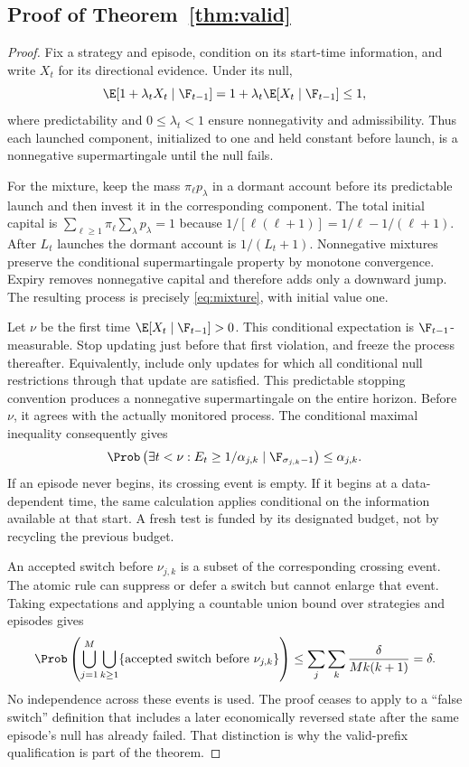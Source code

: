 \subsection{Proof of Theorem~\ref{thm:valid}}
\begin{proof}
Fix a strategy and episode, condition on its start-time information, and write $X_t$ for its directional evidence. Under its null,
\[
 \E[1+\lambda_tX_t\mid\F_{t-1}]
 =1+\lambda_t\E[X_t\mid\F_{t-1}]\le1,
\]
where predictability and $0\le\lambda_t<1$ ensure nonnegativity and admissibility. Thus each launched component, initialized to one and held constant before launch, is a nonnegative supermartingale until the null fails.

For the mixture, keep the mass $\pi_\ell p_\lambda$ in a dormant account before its predictable launch and then invest it in the corresponding component. The total initial capital is
$\sum_{\ell\ge1}\pi_\ell\sum_\lambda p_\lambda=1$ because
$1/[\ell(\ell+1)]=1/\ell-1/(\ell+1)$.
After $L_t$ launches the dormant account is $1/(L_t+1)$. Nonnegative mixtures preserve the conditional supermartingale property by monotone convergence. Expiry removes nonnegative capital and therefore adds only a downward jump. The resulting process is precisely \eqref{eq:mixture}, with initial value one.

Let $\nu$ be the first time $\E[X_t\mid\F_{t-1}]>0$. This conditional expectation is $\F_{t-1}$-measurable. Stop updating just before that first violation, and freeze the process thereafter. Equivalently, include only updates for which all conditional null restrictions through that update are satisfied. This predictable stopping convention produces a nonnegative supermartingale on the entire horizon. Before $\nu$, it agrees with the actually monitored process. The conditional maximal inequality consequently gives
\[
 \Prob\left(\exists t<\nu:E_t\ge1/\alpha_{j,k}\mid\F_{\sigma_{j,k}-1}\right)
 \le\alpha_{j,k}.
\]
If an episode never begins, its crossing event is empty. If it begins at a data-dependent time, the same calculation applies conditional on the information available at that start. A fresh test is funded by its designated budget, not by recycling the previous budget.

An accepted switch before $\nu_{j,k}$ is a subset of the corresponding crossing event. The atomic rule can suppress or defer a switch but cannot enlarge that event. Taking expectations and applying a countable union bound over strategies and episodes gives
\[
 \Prob\left(\bigcup_{j=1}^M\bigcup_{k\ge1}
       \{\text{accepted switch before }\nu_{j,k}\}\right)
 \le\sum_j\sum_k\frac{\delta}{Mk(k+1)}=\delta.
\]
No independence across these events is used. The proof ceases to apply to a ``false switch'' definition that includes a later economically reversed state after the same episode's null has already failed. That distinction is why the valid-prefix qualification is part of the theorem.
\end{proof}

